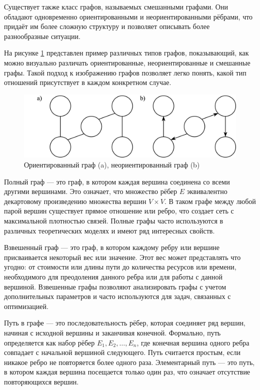 Существует также класс графов, называемых смешанными графами. Они обладают одновременно ориентированными и неориентированными рёбрами, что придаёт им более сложную структуру и позволяет описывать более разнообразные ситуации.

На рисунке \ref{fig:digraph} представлен пример различных типов графов, показывающий, как можно визуально различать ориентированные, неориентированные и смешанные графы. Такой подход к изображению графов позволяет легко понять, какой тип отношений присутствует в каждом конкретном случае.

\begin{figure}[H]
	\begin{center}
		 \includegraphics[width=0.9\linewidth]{src/img/1/digraph.png}
		 \caption{Ориентированный граф (a), неориентированный граф (b)}
		\label{fig:digraph}
	\end{center}
\end{figure}

Полный граф — это граф, в котором каждая вершина соединена со всеми другими вершинами. Это означает, что множество рёбер $E$ эквивалентно декартовому произведению множества вершин $V \times V$. В таком графе между любой парой вершин существует прямое отношение или ребро, что создает сеть с максимальной плотностью связей. Полные графы часто используются в различных теоретических моделях и имеют ряд интересных свойств.

Взвешенный граф — это граф, в котором каждому ребру или вершине присваивается некоторый вес или значение. Этот вес может представлять что угодно: от стоимости или длины пути до количества ресурсов или времени, необходимого для преодоления данного ребра или для работы с данной вершиной. Взвешенные графы позволяют анализировать графы с учетом дополнительных параметров и часто используются для задач, связанных с оптимизацией.

Путь в графе — это последовательность рёбер, которая соединяет ряд вершин, начиная с исходной вершины и заканчивая конечной. Формально, путь определяется как набор рёбер $E_1, E_2, \ldots, E_n$, где конечная вершина одного ребра совпадает с начальной вершиной следующего. Путь считается простым, если никакое ребро не повторяется более одного раза. Элементарный путь — это путь, в котором каждая вершина посещается только один раз, что означает отсутствие повторяющихся вершин.

